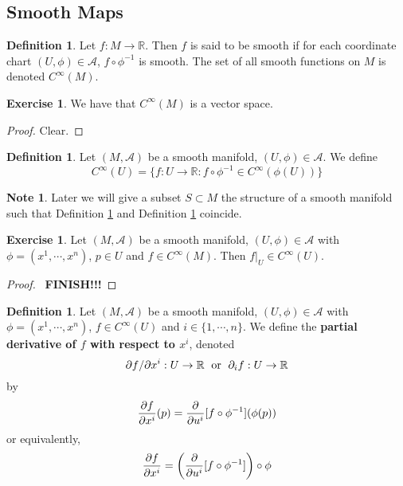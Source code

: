 \documentclass[12pt]{amsart}
\theoremstyle{definition}
\newtheorem{defn}[definition]{Definition}
\newtheorem{note}[definition]{Note}
\newtheorem{ex}[definition]{Exercise}
\newcommand{\R}{\mathbb{R}}
\newcommand{\MA}{\mathcal{A}}
\newcommand{\p}{\partial}
\newcommand{\ld}[1]{\label{defn:#1}}
\newcommand{\rd}[1]{Definition \ref{defn:#1}}
\begin{document}
	
	
	
	
	
	
	
	
	
	
	
	
	
	
	
	\newpage 
	\subsection{Smooth Maps}	
	
	\begin{defn} \ld{42001}
		Let $f: M \rightarrow \R$. Then $f$ is said to be smooth if for each coordinate chart $(U, \phi) \in \MA$, $f \circ \phi^{-1}$ is smooth. The set of all smooth functions on $M$ is denoted $C^{\infty}(M)$. 
	\end{defn}

	\begin{ex} \ld{42002}
		We have that $C^{\infty}(M)$ is a vector space.
	\end{ex}

	\begin{proof}
		Clear.
	\end{proof}
	
	\begin{defn} \ld{42003}
	Let $(M, \MA)$ be a smooth manifold, $(U, \phi) \in \MA$. We define $$C^{\infty}(U) = \{f:U \rightarrow \R: f \circ \phi^{-1} \in C^{\infty}(\phi(U))\}$$
	\end{defn}
	
	\begin{note}
	Later we will give a subset $S \subset M$ the structure of a smooth manifold such that \rd{42001} and \rd{42003} coincide.
	\end{note}
	
	\begin{ex}
	Let $(M, \MA)$ be a smooth manifold, $(U, \phi) \in \MA$ with $\phi = (x^1, \cdots, x^n)$, $p \in U$ and $f \in C^{\infty}(M)$. Then $f|_U \in C^{\infty}(U)$.
	\end{ex}
	
	\begin{proof}\
	\textbf{FINISH!!!}
	\end{proof}
	
	\begin{defn}
	Let $(M, \MA)$ be a smooth manifold, $(U, \phi) \in \MA$ with $\phi = (x^1, \cdots, x^n)$, $f \in C^{\infty}(U)$ and $i \in \{1, \cdots, n\}$. We define the \textbf{partial derivative of $f$ with respect to $x^i$}, denoted $$ \p f / \p x^i: U \rightarrow \R \hspace{.1cm} \text{ or } \hspace{.1cm} \p_{i} f: U \rightarrow \R$$ by 
	\begin{equation*}
	{\pdv{f}{x^i}}(p) = {\pdv{u^i}[f \circ \phi^{-1}] }( \phi(p)) 
	\end{equation*}
	or equivalently,
	\begin{equation*}
	{\pdv{f}{x^i}} = \bigg({\pdv{u^i}[f \circ \phi^{-1}] \bigg) \circ \phi }
	\end{equation*}
	\end{defn}
	
\end{document}
